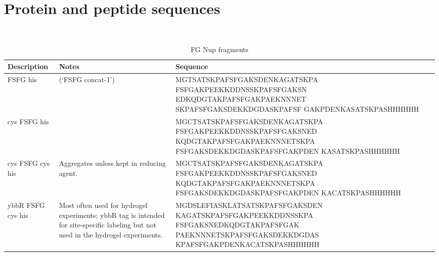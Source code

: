 \chapter{Protein and peptide sequences}~\label{appx:sequences}
\begin{table}[b!]
\centering
  \caption[FG Nup sequences]{FG Nup fragments}
    \label{table:Nups}
    \begin{tabular}{p{3.5cm}p{4cm}p{8cm}}
      Description & Notes &Sequence \\
      \hline
      FSFG his & (`FSFG concat-1') & MGTSATSKPAFSFGAKSDENKAGATSKPA
FSFGAKPEEKKDDNSSKPAFSFGAKSN
EDKQDGTAKPAFSFGAKPAEKNNNET
SKPAFSFGAKSDEKKDGDASKPAFSF
GAKPDENKASATSKPASHHHHHH\\
      \hline
	cys FSFG his & & MGCTSATSKPAFSFGAKSDENKAGATSKPA
FSFGAKPEEKKDDNSSKPAFSFGAKSNED
KQDGTAKPAFSFGAKPAEKNNNETSKPA
FSFGAKSDEKKDGDASKPAFSFGAKPDEN
KASATSKPASHHHHHH\\
      \hline
	cys FSFG cys his& Aggregates unless kept in reducing agent. & MGCTSATSKPAFSFGAKSDENKAGATSKPA
FSFGAKPEEKKDDNSSKPAFSFGAKSNED
KQDGTAKPAFSFGAKPAEKNNNETSKPA
FSFGAKSDEKKDGDASKPAFSFGAKPDEN
KACATSKPASHHHHHH \\
      \hline
	ybbR FSFG cys his & Most often used for hydrogel experiments; ybbR tag is intended for site-specific labeling but not used in the hydrogel experiments.& MGDSLEFIASKLATSATSKPAFSFGAKSDEN
KAGATSKPAFSFGAKPEEKKDDNSSKPA
FSFGAKSNEDKQDGTAKPAFSFGAK
PAEKNNNETSKPAFSFGAKSDEKKDGDAS
KPAFSFGAKPDENKACATSKPASHHHHHH\\
\hline
    \end{tabular}
\end{table}
\newpage
